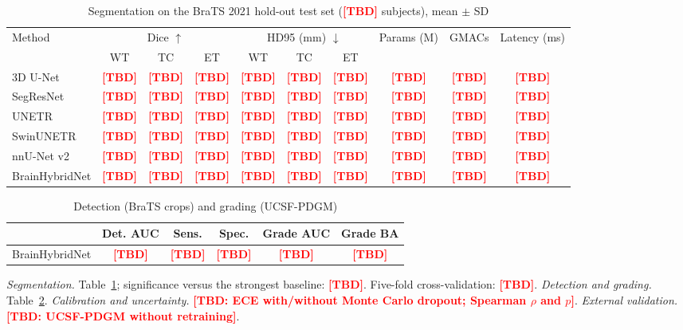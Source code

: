 \documentclass[journal]{IEEEtran}
\newcommand{\tbd}[1][]{\textcolor{red}{\textbf{[TBD#1]}}}
\begin{document}
\begin{table}[!t]
\caption{Segmentation on the BraTS 2021 hold-out test set (\tbd{} subjects), mean $\pm$ SD}
\label{tab:seg}
\centering
\begin{tabular}{lccccccccc}
\toprule
Method & \multicolumn{3}{c}{Dice $\uparrow$} & \multicolumn{3}{c}{HD95 (mm) $\downarrow$} & Params (M) & GMACs & Latency (ms)\\
 & WT & TC & ET & WT & TC & ET & & & \\
\midrule
3D U-Net~\cite{cicek2016} & \tbd & \tbd & \tbd & \tbd & \tbd & \tbd & \tbd & \tbd & \tbd\\
SegResNet~\cite{myronenko2019} & \tbd & \tbd & \tbd & \tbd & \tbd & \tbd & \tbd & \tbd & \tbd\\
UNETR~\cite{hatamizadeh2022unetr} & \tbd & \tbd & \tbd & \tbd & \tbd & \tbd & \tbd & \tbd & \tbd\\
SwinUNETR~\cite{tang2022swinunetr} & \tbd & \tbd & \tbd & \tbd & \tbd & \tbd & \tbd & \tbd & \tbd\\
nnU-Net v2~\cite{isensee2021nnunet} & \tbd & \tbd & \tbd & \tbd & \tbd & \tbd & \tbd & \tbd & \tbd\\
BrainHybridNet & \tbd & \tbd & \tbd & \tbd & \tbd & \tbd & \tbd & \tbd & \tbd\\
\bottomrule
\end{tabular}
\end{table}

\begin{table}[!t]
\caption{Detection (BraTS crops) and grading (UCSF-PDGM)}
\label{tab:det}
\centering
\begin{tabular}{lccccc}
\toprule
 & Det. AUC & Sens. & Spec. & Grade AUC & Grade BA\\
\midrule
BrainHybridNet & \tbd & \tbd & \tbd & \tbd & \tbd\\
\bottomrule
\end{tabular}
\end{table}

\textit{Segmentation.} Table~\ref{tab:seg}; significance versus the strongest baseline: \tbd. Five-fold cross-validation: \tbd.
\textit{Detection and grading.} Table~\ref{tab:det}.
\textit{Calibration and uncertainty.} \tbd[: ECE with/without Monte Carlo dropout; Spearman $\rho$ and $p$].
\textit{External validation.} \tbd[: UCSF-PDGM without retraining].
\end{document}
